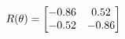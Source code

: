 \documentclass[preview]{standalone}
\begin{document}
\begin{align*}
\special{dvisvgm:raw <g id='unique000'>}R(\theta) = \begin{bmatrix}-0.86 & 0.52\\-0.52 & -0.86\end{bmatrix}\special{dvisvgm:raw </g>}
\end{align*}
\end{document}
